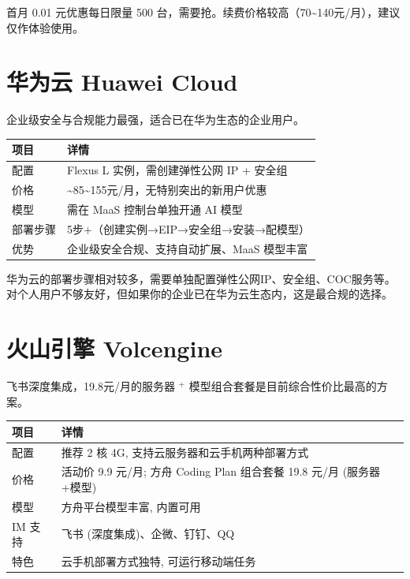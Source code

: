 \documentclass[
  10
]{article}
\newcounter{none} %
\begin{document}
首月 0.01 元优惠每日限量 500
台，需要抢。续费价格较高（70\textasciitilde140元/月），建议仅作体验使用。

\section{华为云 Huawei Cloud}\label{ux534eux4e3aux4e91-huawei-cloud}

企业级安全与合规能力最强，适合已在华为生态的企业用户。

{\def\LTcaptype{none} %
\begin{longtable}[]{@{}|l|l|@{}}
\toprule\noalign{}
\endhead
\bottomrule\noalign{}
\endlastfoot
\hline
项目 & 详情 \\
\hline
配置 & Flexus L 实例，需创建弹性公网 IP + 安全组 \\
\hline
价格 &
\textasciitilde85\textasciitilde155元/月，无特别突出的新用户优惠 \\
\hline
模型 & 需在 MaaS 控制台单独开通 AI 模型 \\
\hline
部署步骤 & 5步+（创建实例→EIP→安全组→安装→配模型） \\
\hline
优势 & 企业级安全合规、支持自动扩展、MaaS 模型丰富 \\
\hline
\end{longtable}
}

华为云的部署步骤相对较多，需要单独配置弹性公网IP、安全组、COC服务等。对个人用户不够友好，但如果你的企业已在华为云生态内，这是最合规的选择。

\section{火山引擎 Volcengine}\label{ux706bux5c71ux5f15ux64ce-volcengine}

飞书深度集成，19.8元/月的服务器 \(^ +\)
模型组合套餐是目前综合性价比最高的方案。

{\def\LTcaptype{none} %
\begin{longtable}[]{@{}|l|l|@{}}
\toprule\noalign{}
\endhead
\bottomrule\noalign{}
\endlastfoot
\hline
项目 & 详情 \\
\hline
配置 & 推荐 2 核 4G, 支持云服务器和云手机两种部署方式 \\
\hline
价格 & 活动价 9.9 元/月; 方舟 Coding Plan 组合套餐 19.8 元/月
(服务器+模型) \\
\hline
模型 & 方舟平台模型丰富, 内置可用 \\
\hline
IM 支持 & 飞书 (深度集成)、企微、钉钉、QQ \\
\hline
特色 & 云手机部署方式独特, 可运行移动端任务 \\
\hline
\end{longtable}
}
\end{document}
